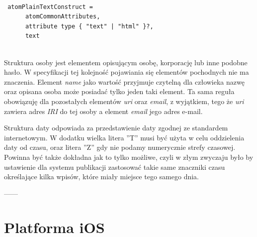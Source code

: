 \documentclass{iiuwb}
\begin{document}
\begin{lstlisting}[label=Struktura tekstu, caption=Struktura tekstu w Atom]

 atomPlainTextConstruct =
      atomCommonAttributes,
      attribute type { "text" | "html" }?,
      text
   
\end{lstlisting}

Struktura osoby jest elementem opisującym osobę, korporację lub inne podobne hasło. W specyfikacji tej kolejność pojawiania się elementów pochodnych nie ma znaczenia. Element \textit{name} jako wartość przyjmuje czytelną dla człowieka nazwę oraz opisana osoba może posiadać tylko jeden taki element. Ta sama reguła obowiązuję dla pozostałych elementów \textit{uri} oraz \textit{email}, z wyjątkiem, tego że \textit{uri} zawiera adres \textit{IRI} do tej osoby a element \textit{email} jego adres e-mail.

Struktura daty odpowiada za przedstawienie daty zgodnej ze standardem internetowym. W dodatku wielka litera ''T'' musi być użyta w celu oddzielenia daty od czasu, oraz litera ''Z'' gdy nie podamy numerycznie strefy czasowej. Powinna być także dokładna jak to tylko możliwe, czyli w złym zwyczaju było by ustawienie dla systemu publikacji zastosować takie same znaczniki czasu określające kilka wpisów, które miały miejsce tego samego dnia.

------%

\cleardoublepage
\chapter{Platforma iOS}
\label{cha:Platforma iOS}
\end{document}
